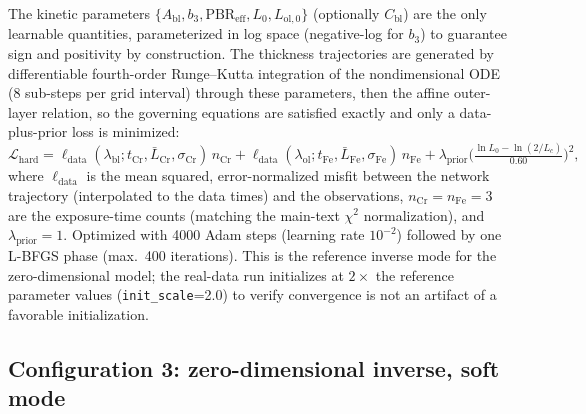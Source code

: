 The kinetic parameters
$\{A_\mathrm{bl}, b_3, \mathrm{PBR}_\text{eff}, L_0, L_{\mathrm{ol},0}\}$
(optionally $C_\mathrm{bl}$) are the only learnable quantities,
parameterized in log space (negative-log for $b_3$) to guarantee sign
and positivity by construction. The thickness trajectories are
generated by differentiable fourth-order Runge--Kutta integration of
the nondimensional ODE (8 sub-steps per grid interval) through these
parameters, then the affine outer-layer relation, so the governing
equations are satisfied exactly and only a data-plus-prior loss is
minimized:
\begin{equation}
\mathcal{L}_\text{hard} =
\ell_\text{data}(\lambda_\mathrm{bl}; t_\text{Cr}, \bar{L}_\text{Cr}, \sigma_\text{Cr})\, n_\text{Cr}
+ \ell_\text{data}(\lambda_\mathrm{ol}; t_\text{Fe}, \bar{L}_\text{Fe}, \sigma_\text{Fe})\, n_\text{Fe}
+ \lambda_\text{prior}\Big(\tfrac{\ln L_0-\ln(2/L_c)}{0.60}\Big)^{\!2},
\label{eq:hardloss}
\end{equation}
where $\ell_\text{data}$ is the mean squared, error-normalized
misfit between the network trajectory (interpolated to the data times)
and the observations, $n_\text{Cr}=n_\text{Fe}=3$ are the exposure-time
counts (matching the main-text $\chi^2$ normalization), and
$\lambda_\text{prior}=1$. Optimized with 4000 Adam steps
(learning rate $10^{-2}$) followed by one L-BFGS phase (max.\ 400
iterations). This is the reference inverse mode for the
zero-dimensional model; the real-data run initializes at $2\times$ the
reference parameter values (\texttt{init\_scale}=2.0) to verify
convergence is not an artifact of a favorable initialization.

\subsection{Configuration 3: zero-dimensional inverse, soft mode}
\label{sec:config-soft}

